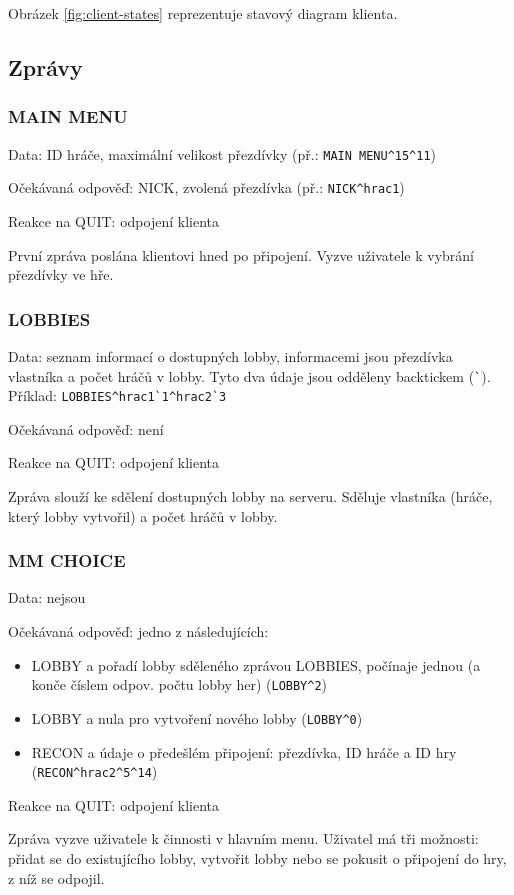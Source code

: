 \documentclass{article}
\begin{document}
Obrázek \ref{fig:client-states} reprezentuje stavový diagram klienta.

\subsection{Zprávy}
\subsubsection{MAIN MENU}
Data: ID hráče, maximální velikost přezdívky (př.: \verb=MAIN MENU^15^11=)

Očekávaná odpověď: NICK, zvolená přezdívka (př.: \verb|NICK^hrac1|)

Reakce na QUIT: odpojení klienta

První zpráva poslána klientovi hned po připojení. Vyzve uživatele k vybrání přezdívky ve hře.

\subsubsection{LOBBIES}
Data: seznam informací o dostupných lobby, informacemi jsou přezdívka vlastníka a počet hráčů v lobby. Tyto dva údaje jsou odděleny backtickem (\verb-`-). Příklad: \verb|LOBBIES^hrac1`1^hrac2`3|

Očekávaná odpověď: není

Reakce na QUIT: odpojení klienta

Zpráva slouží ke sdělení dostupných lobby na serveru. Sděluje vlastníka (hráče, který lobby vytvořil) a počet hráčů v lobby.

\subsubsection{MM CHOICE}
Data: nejsou 

Očekávaná odpověď: jedno z následujících:
\begin{itemize}
    \item LOBBY a pořadí lobby sděleného zprávou LOBBIES, počínaje jednou (a konče číslem odpov. počtu lobby her) (\verb|LOBBY^2|)
    \item LOBBY a nula pro vytvoření nového lobby (\verb|LOBBY^0|)
    \item RECON a údaje o předešlém připojení: přezdívka, ID hráče a ID hry (\verb|RECON^hrac2^5^14|)
\end{itemize}

Reakce na QUIT: odpojení klienta

Zpráva vyzve uživatele k činnosti v hlavním menu. Uživatel má tři možnosti: přidat se do existujícího lobby, vytvořit lobby nebo se pokusit o připojení do hry, z níž se odpojil.
\end{document}

